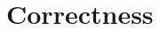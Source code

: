\documentclass[12pt,letterpaper]{article}
\begin{document}
\begin{longtable}{p{4.5in}T}
\end{longtable}

\clearpage
\onehalfspacing

\section*{Correctness}
\end{document}
